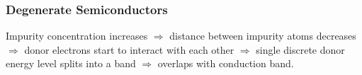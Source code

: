 \documentclass{beamer}
\begin{document}
    \begin{frame} \frametitle{Degenerate Semiconductors}
        \par Impurity concentration increases $\Rightarrow $ distance between impurity atoms decreases $\Rightarrow $ donor electrons start to interact with each other $\Rightarrow $ single discrete donor energy level splits into a band $\Rightarrow $ overlaps with conduction band.
    \end{frame}
\end{document}
